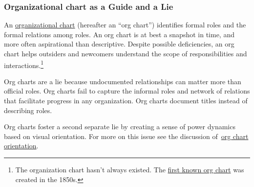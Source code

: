 \subsubsection*{Organizational chart as a Guide and a Lie\label{sec:org-chart-as-guide-and-lie}}

An \href{https://en.wikipedia.org/wiki/Organizational_chart}{organizational chart} 
\iftoggle{WPinmargin}{\marginpar{$>$Wikipedia: Organizational chart}}{}
(hereafter an ``\gls{org chart}'') identifies formal roles and the formal relations among roles. An org chart is at best a snapshot in time, and more often aspirational than descriptive. Despite possible deficiencies, an org chart helps outsiders and newcomers understand the scope of responsibilities and interactions.\footnote{The organization chart hasn't always existed. The \href{https://en.wikipedia.org/wiki/George_Holt_Henshaw\#First_organization_chart}{first known org chart} 
was created in the 1850s.}

Org charts are a lie because undocumented relationships can matter more than official roles. Org charts fail to capture the informal roles and network of relations that facilitate progress in any organization. Org charts document titles instead of describing roles.

Org charts foster a second separate lie by creating a sense of power dynamics based on visual orientation. For more on this issue see the discussion of~\hyperref[sec:org-chart-orientation]{org chart orientation}\iftoggle{haspagenumbers}{ on page~\pageref{sec:org-chart-orientation}}{}.
